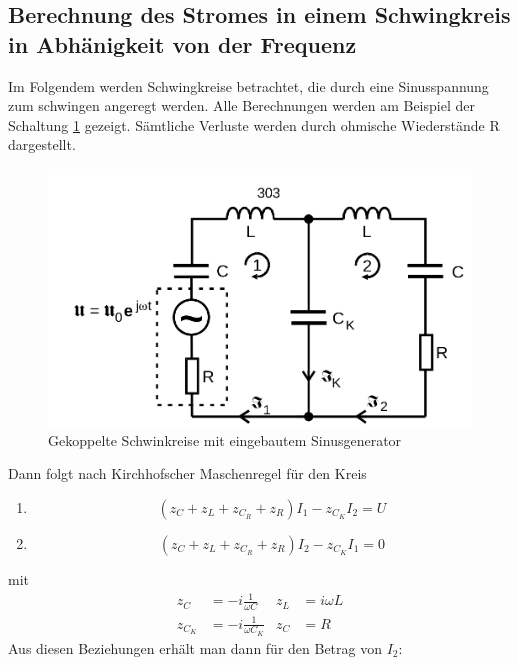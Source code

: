   \subsection{Berechnung des Stromes in einem Schwingkreis in Abhänigkeit von der Frequenz}
  Im Folgendem werden Schwingkreise betrachtet, die durch eine Sinusspannung zum schwingen angeregt werden. Alle Berechnungen werden am Beispiel der Schaltung \ref{fig:Abb4} gezeigt.
  Sämtliche Verluste werden durch ohmische Wiederstände R dargestellt.
  \begin{figure}
    \centering
    \includegraphics[width=\textwidth]{./logos/Abb4.png}
    \caption{Gekoppelte Schwinkreise mit eingebautem Sinusgenerator}
    \label{fig:Abb4}
  \end{figure}
  Dann folgt nach Kirchhofscher Maschenregel  für den Kreis
  \begin{enumerate}
    \item
    \begin{equation}
        (z_C + z_L + z_{C_R} + z_R)I_1 - z_{C_K} I_2 = U
        \label{eqn:U1}
    \end{equation}
      \item
      \begin{equation}
          (z_C + z_L + z_{C_R} + z_R)I_2 - z_{C_K} I_1 = 0
          \label{eqn:U2}
      \end{equation}

  \end{enumerate}
  mit
  \begin{align*}
    z_C & =  -i \frac{1}{\omega C} & z_L & =  i\omega L \\
    z_{C_K} & = -i \frac{1}{\omega C_K} &  z_C & =  R
  \end{align*}
Aus diesen Beziehungen erhält man dann für den Betrag von $I_2$:
